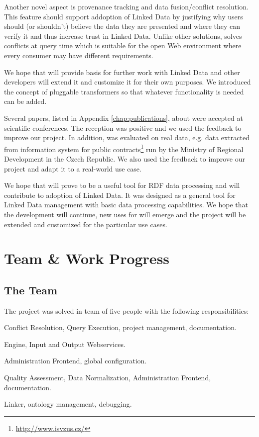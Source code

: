 Another novel aspect is provenance tracking and data fusion/conflict resolution. This feature should support addoption of Linked Data by justifying why users should (or shouldn't) believe the data they are presented and where they can verify it and thus increase trust in Linked Data. Unlike other solutions, \odcs solves conflicts at query time which is suitable for the open Web environment where every consumer may have different requirements.

We hope that \odcs will provide basis for further work with Linked Data and other developers will extend it and customize it for their own purposes. We introduced the concept of pluggable transformers so that whatever functionality is needed can be added.

Several papers, listed in Appendix \ref{chap:publications}, about \odcs were accepted at scientific conferences. The reception was positive and we used the feedback to improve our project. In addition, \odcs was evaluated on real data, e.g. data extracted from information system for public contracts\footnote{\url{http://www.isvzus.cz/}} run by the Ministry of Regional Development in the Czech Republic. We also used the feedback to improve our project and adapt it to a real-world use case.

We hope that \odcs will prove to be a useful tool for RDF data processing and will contribute to adoption of Linked Data. It was designed as a general tool for Linked Data management with basic data processing capabilities. We hope that the development will continue, new uses for \odcs will emerge and the project will be extended and customized for the particular use cases.




\appendix

\chapter{Team \& Work Progress}

\section*{The Team}
The project was solved in team of five people with the following responsibilities:

\begin{description}[style=nextline]
  \item[Jan Michelfeit]
    Conflict Resolution, Query Execution, project management, documentation.
  \item[Petr Jerman] 
    Engine, Input and Output Webservices.
  \item[Du\v san Rychnovsk\' y]
    Administration Frontend, global configuration.
  \item[Jakub Daniel]
    Quality Assessment, Data Normalization, Administration Frontend, documentation.
  \item[Tom\' a\v s Soukup]
    Linker, ontology management, debugging.
\end{description}

